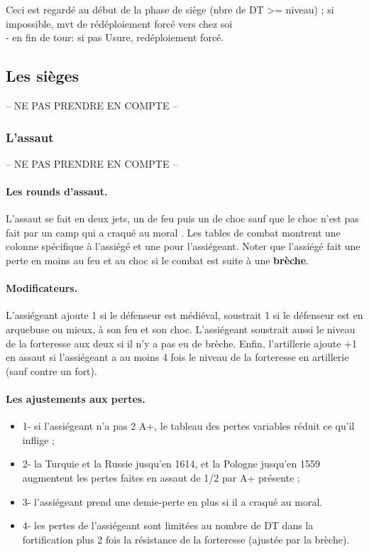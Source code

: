 Ceci est regardé au début de la phase de siège (nbre de DT >= niveau) ;
si impossible, mvt de rédéploiement forcé vers chez soi \\
- en fin de tour: si pas Usure\faceplus, redéploiement forcé.


\subsection{Les sièges}
-- NE PAS PRENDRE EN COMPTE --


\subsubsection{L'assaut}
-- NE PAS PRENDRE EN COMPTE --


\paragraph{Les rounds d'assaut.}
L'assaut se fait en deux jets, un de feu puis un de choc sauf que
le choc n'est pas fait par un camp qui a craqué au moral .
Les tables de combat montrent une colonne spécifique à l'assiégé et une pour l'assiégeant.
Noter que l'assiégé fait une perte en moins au feu et au choc si le combat est
suite à une \textbf{brèche}.


\paragraph{Modificateurs.}
L'assiégeant ajoute 1 si le défenseur est médiéval, soustrait 1 si le défenseur est en arquebuse
ou mieux, à son feu et son choc.
L'assiégeant soustrait aussi le niveau de la forteresse aux deux si il n'y a pas eu de
brèche. Enfin, l'artillerie ajoute  +1 en assaut si l'assiégeant a au moins
4 fois le niveau de la forteresse en artillerie (sauf contre un fort).

\paragraph{Les ajustements aux pertes.}
\begin{itemize}
\item 1- si l'assiégeant n'a pas 2 A+, le tableau des pertes variables réduit
ce qu'il inflige ;
\item 2- la Turquie et la Russie jusqu'en 1614, et la Pologne jusqu'en 1559 augmentent
les pertes faites en assaut de 1/2 par A+ présente ;
\item 3- l'assiégeant prend une demie-perte en plus si il a craqué au moral.
\item 4- les pertes de l'assiégeant sont limitées au nombre de DT dans la
fortification plus 2 fois la résistance de
la forteresse (ajustée par la brèche).
\end{itemize}

